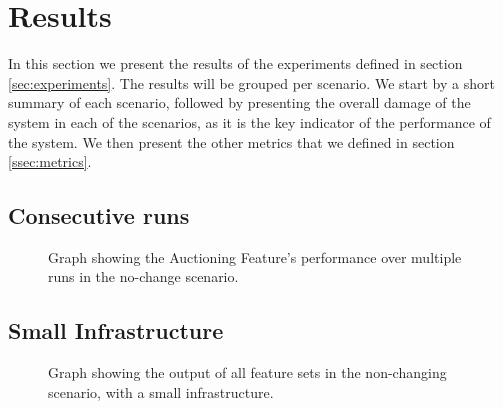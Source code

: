 \section{Results}
\label{sec:results}
In this section we present the results of the experiments defined in section \ref{sec:experiments}. The results will be grouped per scenario. We start by a short summary of each scenario, followed by presenting the overall damage of the system in each of the scenarios, as it is the key indicator of the performance of the system. We then present the other metrics that we defined in section \ref{ssec:metrics}.







\subsection*{Consecutive runs}
\begin{figure}[H]
    \centering
        
    \caption{Graph showing the Auctioning Feature's performance over multiple runs in the no-change scenario.}
\end{figure}

\subsection*{Small Infrastructure}
\begin{figure}[H]
    \centering
        
    \caption{Graph showing the output of all feature sets in the non-changing scenario, with a small infrastructure.}
\end{figure}
